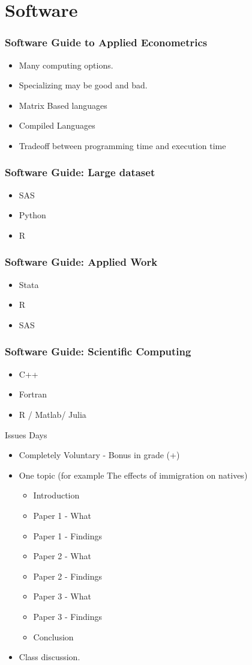 \documentclass{beamer}
\newcommand{\1}{\mathbb{1}}
\begin{document}
\section{Software}

\begin{frame}\frametitle{Software Guide to Applied Econometrics}
\begin{itemize}
\item Many computing options.
\item Specializing may be good and bad.
\item Matrix Based languages
\item Compiled Languages
\item Tradeoff between programming time and execution time
\end{itemize}
\end{frame}

\begin{frame}\frametitle{Software Guide: Large dataset}
\begin{itemize}
\item SAS
\item Python
\item R
\end{itemize}
\end{frame}

\begin{frame}\frametitle{Software Guide: Applied Work}
\begin{itemize}
\item Stata
\item R
\item SAS
\end{itemize}
\end{frame}

\begin{frame}\frametitle{Software Guide: Scientific Computing}
\begin{itemize}
\item C++
\item Fortran
\item R / Matlab/ Julia
\end{itemize}
\end{frame}

\begin{frame}{Issues Days}
\begin{itemize}
\item Completely Voluntary - Bonus in grade (+)
\item One topic (for example The effects of immigration on natives)
\begin{itemize}
\item Introduction 
\item Paper 1 - What
\item Paper 1 - Findings 
\item Paper 2 - What 
\item Paper 2 - Findings
\item Paper 3 - What
\item Paper 3 - Findings
\item Conclusion
\end{itemize}
\item Class discussion.
\end{itemize}
\end{frame}
\end{document}
